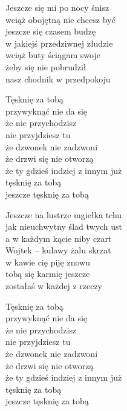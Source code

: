 \begin{text}
    Jeszcze się mi po nocy śnisz\\
    wciąż obojętną nie chcesz być\\
    jeszcze się czasem budzę\\
    w jakiejś przedziwnej złudzie\\
    wciąż buty ściągam swoje\\
    żeby się nie pobrudził\\
    nasz chodnik w przedpokoju

    Tęsknię za tobą\\
    przywyknąć nie da się\\
    że nie przychodzisz\\
    nie przyjdziesz tu\\
    że dzwonek nie zadzwoni\\
    że drzwi się nie otworzą\\
    że ty gdzieś indziej z innym już\\
    tęsknię za tobą\\
    jeszcze tęsknię za tobą

    Jeszcze na lustrze mgiełka tchu\\
    jak nieuchwytny ślad twych ust\\
    a w każdym kącie niby czart\\
    Wojtek – kulawy żalu skrzat\\
    w kawie cię piję znowu\\
    tobą się karmię jeszcze\\
    zostałaś w każdej z rzeczy

    Tęsknię za tobą\\
    przywyknąć nie da się\\
    że nie przychodzisz\\
    nie przyjdziesz tu\\
    że dzwonek nie zadzwoni\\
    że drzwi się nie otworzą\\
    że ty gdzieś indziej z innym już\\
    tęsknię za tobą\\
    jeszcze tęsknię za tobą
\end{text}
